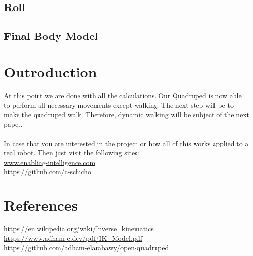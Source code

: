 \documentclass{article}
\begin{document}
    \subsection{Roll}
    \paragraph{}

    \subsection{Final Body Model}
    \paragraph{}



    \section{Outroduction}
    \paragraph{}
    At this point we are done with all the calculations. Our Quadruped is now able to perform all necessary movements except walking. The next step will be to make the quadruped walk. Therefore, dynamic walking will be subject of the next paper.
    \paragraph{}
    In case that you are interested in the project or how all of this works applied to a real robot. Then just visit the following sites: \\
    \url{www.enabling-intelligence.com} \\
    \url{https://github.com/c-schicho}



    \section{References}
    \url{https://en.wikipedia.org/wiki/Inverse_kinematics} \\
    \url{https://www.adham-e.dev/pdf/IK_Model.pdf} \\
    \url{https://github.com/adham-elarabawy/open-quadruped}
\end{document}
